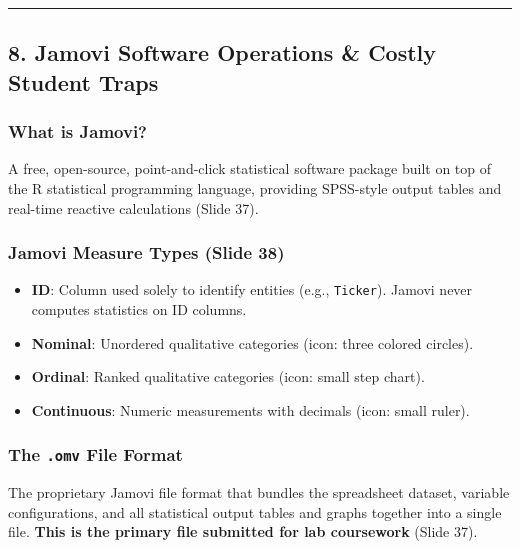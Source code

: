 \documentclass[
]{article}
\providecommand{\tightlist}{%
  \setlength{\itemsep}{0pt}\setlength{\parskip}{0pt}}
\begin{document}
\begin{center}\rule{0.5\linewidth}{0.5pt}\end{center}

\subsection{8. Jamovi Software Operations \& Costly Student
Traps}\label{jamovi-software-operations-costly-student-traps}

\subsubsection{What is Jamovi?}\label{what-is-jamovi}

A free, open-source, point-and-click statistical software package built
on top of the R statistical programming language, providing SPSS-style
output tables and real-time reactive calculations (Slide 37).

\subsubsection{Jamovi Measure Types (Slide
38)}\label{jamovi-measure-types-slide-38}

\begin{itemize}
\tightlist
\item
  \textbf{ID}: Column used solely to identify entities (e.g.,
  \texttt{Ticker}). Jamovi never computes statistics on ID columns.
\item
  \textbf{Nominal}: Unordered qualitative categories (icon: three
  colored circles).
\item
  \textbf{Ordinal}: Ranked qualitative categories (icon: small step
  chart).
\item
  \textbf{Continuous}: Numeric measurements with decimals (icon: small
  ruler).
\end{itemize}

\subsubsection{\texorpdfstring{The \texttt{.omv} File
Format}{The .omv File Format}}\label{the-.omv-file-format}

The proprietary Jamovi file format that bundles the spreadsheet dataset,
variable configurations, and all statistical output tables and graphs
together into a single file. \textbf{This is the primary file submitted
for lab coursework} (Slide 37).
\end{document}
